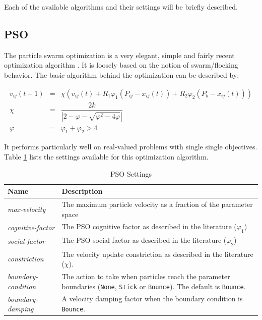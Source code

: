 \documentclass{report}
\begin{document}
Each of the available algorithms and their settings will be briefly described.

\subsection{PSO}
The particle swarm optimization is a very elegant, simple and fairly recent
optimization algorithm \cite{kennedy_pso_1995,clerc_pse_2002}. It is
loosely based on the notion of swarm/flocking behavior. The basic algorithm
behind the optimization can be described by:

\begin{eqnarray*}
	v_{ij}(t + 1) & = & \chi (v_{ij}(t) + R_1 \varphi_1 (P_{ij} - x_{ij}(t)) + R_2 \varphi_2 (P_b - x_{ij}(t))) \\
	\chi & = & \dfrac{2k}{|2 - \varphi - \sqrt{\varphi^2 - 4\varphi}|} \\
	\varphi & = & \varphi_1 + \varphi_2 > 4
\end{eqnarray*}

It performs particularly well on real-valued problems with single single
objectives. Table \ref{tab:pso_settings} lists the settings available for this
optimization algorithm.

\begin{table}[h!tb]\caption{PSO Settings}\label{tab:pso_settings}\vspace{0.1in}
	\centering

	\begin{tabular}{p{4cm} p{12cm}}
		\toprule
		\textbf{Name} & \textbf{Description} \\
		\midrule
		\textit{max-velocity} & The maximum particle velocity as a fraction of
		                        the parameter space \\
		\textit{cognitive-factor} & The PSO cognitive factor as described in the
		                            literature ($\varphi_1$) \\
		\textit{social-factor} & The PSO social factor as described in the
		                         literature ($\varphi_2$) \\
		\textit{constriction} & The velocity update constriction as described
		                        in the literature ($\chi$). \\
		\textit{boundary-condition} & The action to take when particles reach
		                              the parameter boundaries (\verb!None!,
		                              \verb!Stick! or \verb!Bounce!). The
		                              default is \verb!Bounce!. \\
		\textit{boundary-damping} & A velocity damping factor when the boundary
		                            condition is \verb!Bounce!. \\
		\bottomrule
	\end{tabular}
\end{table}
\end{document}
